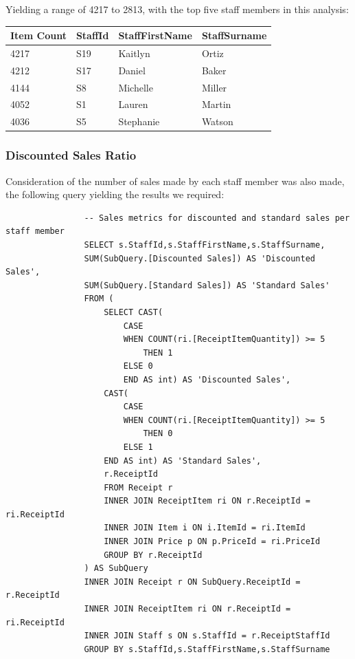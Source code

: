 \documentclass{article}
\begin{document}
                Yielding a range of 4217 to 2813, with the top five staff members in this
                analysis:
                \begin{table}[H]
                    \centering
                    \begin{tabular}{|l|l|l|l|}
                    \hline
                    Item Count & StaffId & StaffFirstName & StaffSurname \\ \hline
                    4217       & S19     & Kaitlyn        & Ortiz        \\ \hline
                    4212       & S17     & Daniel         & Baker        \\ \hline
                    4144       & S8      & Michelle       & Miller       \\ \hline
                    4052       & S1      & Lauren         & Martin       \\ \hline
                    4036       & S5      & Stephanie      & Watson       \\ \hline
                    \end{tabular}
                \end{table}

            \newpage
            \subsubsection{Discounted Sales Ratio}
                Consideration of the number of sales made by each staff member was also made,
                the following query yielding the results we required:

            \begin{lstlisting}
                -- Sales metrics for discounted and standard sales per staff member
                SELECT s.StaffId,s.StaffFirstName,s.StaffSurname,
                SUM(SubQuery.[Discounted Sales]) AS 'Discounted Sales',
                SUM(SubQuery.[Standard Sales]) AS 'Standard Sales'
                FROM (
                    SELECT CAST(
                        CASE
                        WHEN COUNT(ri.[ReceiptItemQuantity]) >= 5
                            THEN 1
                        ELSE 0
                        END AS int) AS 'Discounted Sales',
                    CAST(
                        CASE
                        WHEN COUNT(ri.[ReceiptItemQuantity]) >= 5
                            THEN 0
                        ELSE 1
                    END AS int) AS 'Standard Sales',
                    r.ReceiptId
                    FROM Receipt r
                    INNER JOIN ReceiptItem ri ON r.ReceiptId = ri.ReceiptId
                    INNER JOIN Item i ON i.ItemId = ri.ItemId
                    INNER JOIN Price p ON p.PriceId = ri.PriceId
                    GROUP BY r.ReceiptId
                ) AS SubQuery
                INNER JOIN Receipt r ON SubQuery.ReceiptId = r.ReceiptId
                INNER JOIN ReceiptItem ri ON r.ReceiptId = ri.ReceiptId
                INNER JOIN Staff s ON s.StaffId = r.ReceiptStaffId
                GROUP BY s.StaffId,s.StaffFirstName,s.StaffSurname
            \end{lstlisting}
\end{document}
